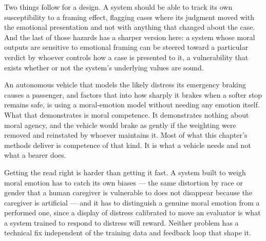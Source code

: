 Two things follow for a design. A system should be able to track its own susceptibility to a framing effect, flagging cases where its judgment moved with the emotional presentation and not with anything that changed about the case. And the last of those hazards has a sharper version here: a system whose moral outputs are sensitive to emotional framing can be steered toward a particular verdict by whoever controls how a case is presented to it, a vulnerability that exists whether or not the system's underlying values are sound.

An autonomous vehicle that models the likely distress its emergency braking causes a passenger, and factors that into how sharply it brakes when a softer stop remains safe, is using a moral-emotion model without needing any emotion itself. What that demonstrates is moral competence. It demonstrates nothing about moral agency, and the vehicle would brake as gently if the weighting were removed and reinstated by whoever maintains it. Most of what this chapter's methods deliver is competence of that kind. It is what a vehicle needs and not what a bearer does.

Getting the read right is harder than getting it fast. A system built to weigh moral emotion has to catch its own biases — the same distortion by race or gender that a human caregiver is vulnerable to does not disappear because the caregiver is artificial — and it has to distinguish a genuine moral emotion from a performed one, since a display of distress calibrated to move an evaluator is what a system trained to respond to distress will reward. Neither problem has a technical fix independent of the training data and feedback loop that shape it.
